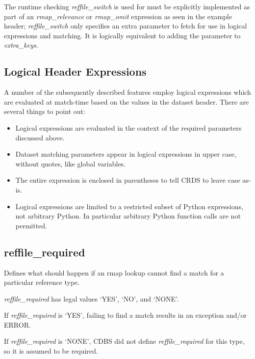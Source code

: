 \documentclass[letterpaper,10pt,english]{sphinxmanual}
\begin{document}
The runtime checking \emph{reffile\_switch} is used for must be explicitly implemented as part of an \emph{rmap\_relevance} or
\emph{rmap\_omit} expression as seen in the example header; \emph{reffile\_switch} only specifies an extra parameter to fetch
for use in logical expressions and matching.  It is logically equivalent to adding the parameter to \emph{extra\_keys}.


\subsection{Logical Header Expressions}
\label{rmap_syntax:logical-header-expressions}
A number of the subsequently described features employ logical expressions which are evaluated at match-time
based on the values in the dataset header.  There are several things to point out:
\begin{itemize}
\item {} 
Logical expressions are evaluated in the context of the required parameters discussed above.

\item {} 
Dataset matching parameters appear in logical expressions in upper case,  without quotes, like global variables.

\item {} 
The entire expression is enclosed in parentheses to tell CRDS to leave case as-is.

\item {} 
Logical expressions are limited to a restricted subset of Python expressions,  not arbitrary Python.  In particular
arbitrary Python function calls are not permitted.

\end{itemize}


\subsection{reffile\_required}
\label{rmap_syntax:reffile-required}
Defines what should happen if an rmap lookup cannot find a match for a particular reference type.

\emph{reffile\_required} has legal values `YES', `NO', and `NONE'.

If \emph{reffile\_required} is `YES', failing to find a match results in an exception and/or ERROR.

If \emph{reffile\_required} is `NONE', CDBS did not define \emph{reffile\_required} for this type, so it is assumed to be required.
\end{document}
